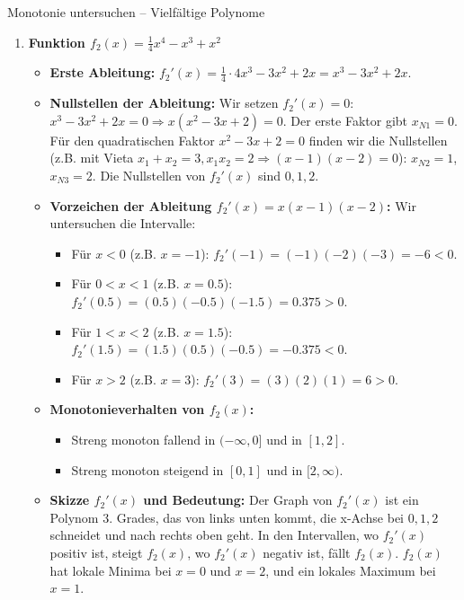 \begin{loesungsumgebung}{Monotonie untersuchen – Vielfältige Polynome}
\begin{enumerate}[label=(\alph*)]
    \item \textbf{Funktion $f_2(x) = \frac{1}{4}x^4 - x^3 + x^2$}
    \begin{itemize}
        \item \textbf{Erste Ableitung:} $f_2'(x) = \frac{1}{4} \cdot 4x^3 - 3x^2 + 2x = x^3 - 3x^2 + 2x$.
        \item \textbf{Nullstellen der Ableitung:} Wir setzen $f_2'(x)=0$:
        $x^3 - 3x^2 + 2x = 0 \Rightarrow x(x^2 - 3x + 2) = 0$.
        Der erste Faktor gibt $x_{N1} = 0$.
        Für den quadratischen Faktor $x^2 - 3x + 2 = 0$ finden wir die Nullstellen (z.B. mit Vieta $x_1+x_2=3, x_1x_2=2 \Rightarrow (x-1)(x-2)=0$): $x_{N2} = 1$, $x_{N3} = 2$.
        Die Nullstellen von $f_2'(x)$ sind $0, 1, 2$.
        \item \textbf{Vorzeichen der Ableitung $f_2'(x) = x(x-1)(x-2)$:}
        Wir untersuchen die Intervalle:
        \begin{itemize}
            \item Für $x < 0$ (z.B. $x=-1$): $f_2'(-1) = (-1)(-2)(-3) = -6 < 0$.
            \item Für $0 < x < 1$ (z.B. $x=0.5$): $f_2'(0.5) = (0.5)(-0.5)(-1.5) = 0.375 > 0$.
            \item Für $1 < x < 2$ (z.B. $x=1.5$): $f_2'(1.5) = (1.5)(0.5)(-0.5) = -0.375 < 0$.
            \item Für $x > 2$ (z.B. $x=3$): $f_2'(3) = (3)(2)(1) = 6 > 0$.
        \end{itemize}
        \item \textbf{Monotonieverhalten von $f_2(x)$:}
        \begin{itemize}
            \item Streng monoton fallend in $(-\infty, 0]$ und in $[1, 2]$.
            \item Streng monoton steigend in $[0, 1]$ und in $[2, \infty)$.
        \end{itemize}
        \item \textbf{Skizze $f_2'(x)$ und Bedeutung:} Der Graph von $f_2'(x)$ ist ein Polynom 3. Grades, das von links unten kommt, die x-Achse bei $0, 1, 2$ schneidet und nach rechts oben geht. In den Intervallen, wo $f_2'(x)$ positiv ist, steigt $f_2(x)$, wo $f_2'(x)$ negativ ist, fällt $f_2(x)$. $f_2(x)$ hat lokale Minima bei $x=0$ und $x=2$, und ein lokales Maximum bei $x=1$.
    \end{itemize}


\end{enumerate}
\end{loesungsumgebung}
